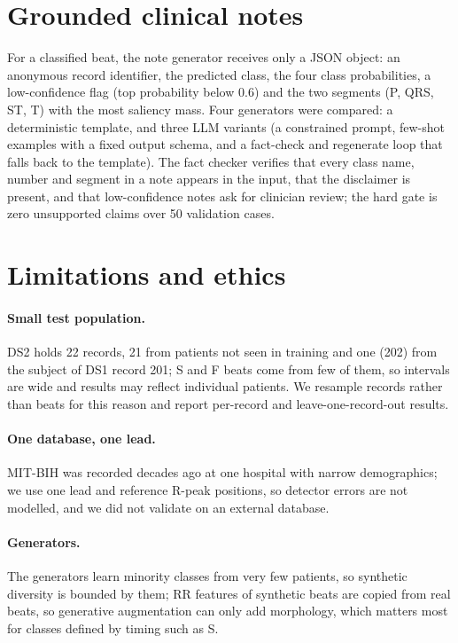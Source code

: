 \documentclass[11pt]{article}
\begin{document}
\section{Grounded clinical notes}
For a classified beat, the note generator receives only a JSON object: an anonymous record identifier, the
predicted class, the four class probabilities, a low-confidence flag (top probability below 0.6) and the two
segments (P, QRS, ST, T) with the most saliency mass. Four generators were compared: a deterministic template,
and three LLM variants (a constrained prompt, few-shot examples with a fixed output schema, and a fact-check and
regenerate loop that falls back to the template). The fact checker verifies that every class name, number and
segment in a note appears in the input, that the disclaimer is present, and that low-confidence notes ask for
clinician review; the hard gate is zero unsupported claims over 50 validation cases.

\begin{table}[htbp]\centering\small\caption{Note generators: unsupported claims and coverage.}\label{tab:notes}\end{table}

\section{Limitations and ethics}
\paragraph{Small test population.} DS2 holds 22 records, 21 from patients not seen in training and one (202) from
the subject of DS1 record 201; S and F beats come from few of them, so intervals are wide and results may reflect
individual patients. We resample records rather than beats for this reason and report per-record and
leave-one-record-out results.
\paragraph{One database, one lead.} MIT-BIH was recorded decades ago at one hospital with narrow demographics; we
use one lead and reference R-peak positions, so detector errors are not modelled, and we did not validate on an
external database.
\paragraph{Generators.} The generators learn minority classes from very few patients, so synthetic diversity is
bounded by them; RR features of synthetic beats are copied from real beats, so generative augmentation can only
add morphology, which matters most for classes defined by timing such as S.
\end{document}
